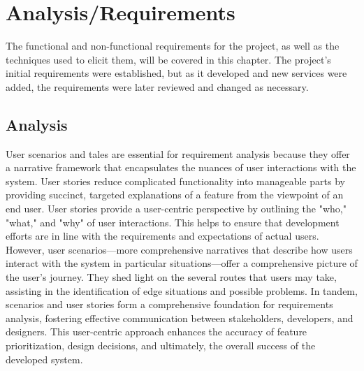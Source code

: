 \documentclass{l4proj}
\begin{document}

\chapter{Analysis/Requirements}
The functional and non-functional requirements for the project, as well as the techniques used to elicit them, will be covered in this chapter. The project's initial requirements were established, but as it developed and new services were added, the requirements were later reviewed and changed as necessary.

\section{Analysis}
User scenarios and tales are essential for requirement analysis because they offer a narrative framework that encapsulates the nuances of user interactions with the system. User stories reduce complicated functionality into manageable parts by providing succinct, targeted explanations of a feature from the viewpoint of an end user. User stories provide a user-centric perspective by outlining the "who," "what," and "why" of user interactions. This helps to ensure that development efforts are in line with the requirements and expectations of actual users. However, user scenarios—more comprehensive narratives that describe how users interact with the system in particular situations—offer a comprehensive picture of the user's journey. They shed light on the several routes that users may take, assisting in the identification of edge situations and possible problems. In tandem, scenarios and user stories form a comprehensive foundation for requirements analysis, fostering effective communication between stakeholders, developers, and designers. This user-centric approach enhances the accuracy of feature prioritization, design decisions, and ultimately, the overall success of the developed system.
\end{document}
